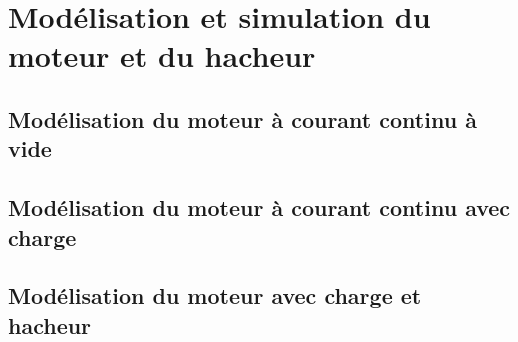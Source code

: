 \section{Modélisation et simulation du moteur et du hacheur}

\subsection{Modélisation du moteur à courant continu à vide}

\subsection{Modélisation du moteur à courant continu avec charge}

\subsection{Modélisation du moteur avec charge et hacheur}